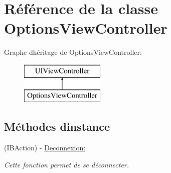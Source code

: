 \hypertarget{interface_options_view_controller}{}\section{Référence de la classe Options\+View\+Controller}
\label{interface_options_view_controller}
Graphe d\textquotesingle{}héritage de Options\+View\+Controller\+:\begin{figure}[H]
\begin{center}
\leavevmode
\includegraphics[height=2.000000cm]{interface_options_view_controller}
\end{center}
\end{figure}
\subsection*{Méthodes d\textquotesingle{}instance}
\begin{DoxyCompactItemize}
\item 
(I\+B\+Action) -\/ \hyperlink{interface_options_view_controller_ae289dba5464ac01419874ed59546f649}{Deconnexion\+:}
\begin{DoxyCompactList}\small\item\em Cette fonction permet de se déconnecter. \end{DoxyCompactList}\end{DoxyCompactItemize}
